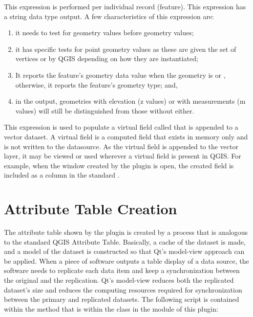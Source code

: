 \documentclass[a4paper,11pt,english]{sphinxmanual}
\begin{document}
This expression is performed per individual record (feature).  This expression has a string data type output.  A few characteristics of this expression are:
\begin{enumerate}
\def\theenumi{\arabic{enumi}}
\def\labelenumi{\theenumi .}
\makeatletter\def\p@enumii{\p@enumi \theenumi .}\makeatother
\item {} 
it needs to test for  geometry values before  geometry values;

\item {} 
it has specific tests for  point geometry values as these are given the set of vertices  or  by QGIS depending on how they are instantiated;

\item {} 
It reports the feature’s geometry data value when the geometry is  or , otherwise, it reports the feature’s geometry type; and,

\item {} 
in the output, geometries with elevation (z values) or with measurements (m values) will still be distinguished from those without either.

\end{enumerate}

This expression is used to populate a virtual field called  that is appended to a vector dataset.  A virtual field is a computed field that exists in memory only and is not written to the datasource.  As the virtual field is appended to the vector layer, it may be viewed or used wherever a virtual field is present in QGIS.  For example, when the window created by the plugin is open, the created  field is included as a column in the standard .


\section{Attribute Table Creation}
\label{\detokenize{pluginDesign:attribute-table-creation}}
The attribute table shown by the plugin is created by a process that is analogous to the standard QGIS Attribute Table.  Basically, a cache of the dataset is made, and a model of the dataset is constructed so that Qt’s model-view  approach can be applied.  When a piece of software outputs a table display of a data source, the software needs to replicate each data item and keep a synchronization between the original and the replication.  Qt’s model-view reduces both the replicated dataset’s size and reduces the computing resources required for synchronization between the primary and replicated datasets.  The following script is contained within the  method that is within the  class in the  module of this plugin:
\end{document}
